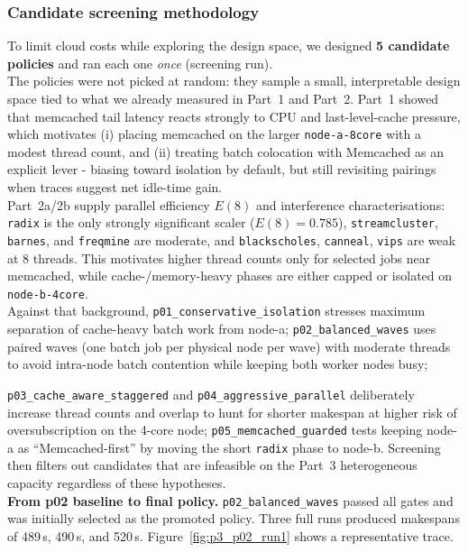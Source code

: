 \begin{enumerate}
\begin{enumerate}
\subsubsection*{Candidate screening methodology}

To limit cloud costs while exploring the design space, we designed
\textbf{5 candidate policies} and ran each one \emph{once} (screening run). \\
The policies were not picked at random: they sample a small, interpretable
design space tied to what we already measured in Part~1 and Part~2.
Part~1 showed that memcached tail latency reacts strongly to CPU and
last-level-cache pressure, which motivates (i) placing memcached on the
larger \texttt{node-a-8core} with a modest thread count, and (ii) treating
batch colocation with Memcached as an explicit lever - biasing toward isolation
by default, but still revisiting pairings when traces suggest net idle-time gain.
\\

Part~2a/2b supply parallel efficiency $E(8)$ and interference characterisations:
\texttt{radix} is the only strongly significant scaler ($E(8)=0.785$),
\texttt{streamcluster}, \texttt{barnes}, and \texttt{freqmine} are moderate,
and \texttt{blackscholes}, \texttt{canneal}, \texttt{vips} are weak at
8 threads. This motivates higher thread counts only for selected jobs near
memcached, while cache-/memory-heavy phases are either capped or isolated on
\texttt{node-b-4core}. \\

Against that background, \texttt{p01\_conservative\_isolation} stresses
maximum separation of cache-heavy batch work from node-a;
\texttt{p02\_balanced\_waves} uses paired waves (one batch job per physical node per wave) with moderate threads to avoid intra-node batch contention while keeping both worker nodes busy;

\texttt{p03\_cache\_aware\_staggered} and \texttt{p04\_aggressive\_parallel}
deliberately increase thread counts and overlap to hunt for shorter makespan at higher risk of oversubscription on the 4-core node;
\texttt{p05\_memcached\_guarded} tests keeping node-a as ``Memcached-first''
by moving the short \texttt{radix} phase to node-b.
Screening then filters out candidates that are infeasible on the Part~3
heterogeneous capacity regardless of these hypotheses. \\

\medskip
\noindent\textbf{From p02 baseline to final policy.}
\texttt{p02\_balanced\_waves} passed all gates and was initially selected as
the promoted policy. Three full runs produced makespans of 489\,s, 490\,s, and 520\,s.
Figure~\ref{fig:p3_p02_run1} shows a representative trace.


\end{enumerate}
\end{enumerate}
